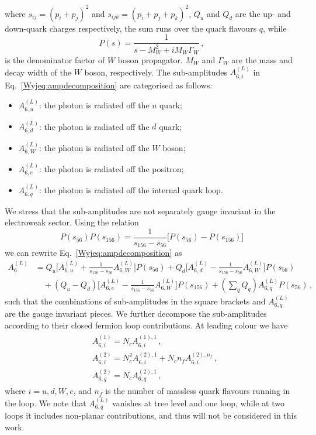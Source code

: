 \documentclass[main.tex]{subfiles}
\begin{document}
where $s_{ij}=(p_i+p_j)^2$ and $s_{ijk}=(p_i+p_j+p_k)^2$, $Q_u$ and $Q_d$ are the up- and down-quark charges respectively, the sum runs over the quark flavours $q$, while 
\begin{equation}
P(s) = \frac{1}{s-M_W^2+i M_W \Gamma_W} \,,
\end{equation}
is the denominator factor of $W$ boson propagator. 
$M_W$ and $\Gamma_W$ are the mass and decay width of the $W$ boson, respectively.
The sub-amplitudes $A_{6,i}^{(L)}$ in Eq.~\eqref{Wyjeq:ampdecomposition} are categorised as follows:
\begin{itemize}
\item $A^{(L)}_{6,u}$: the photon is radiated off the $u$ quark;
\item $A^{(L)}_{6,d}$: the photon is radiated off the $d$ quark;
\item $A^{(L)}_{6,W}$: the photon is radiated off the $W$ boson;
\item $A^{(L)}_{6,e}$: the photon is radiated off the positron;
\item $A^{(L)}_{6,q}$: the photon is radiated off the internal quark loop.
\end{itemize}
%
We stress that the sub-amplitudes are not separately gauge invariant in the electroweak sector.
Using the relation~\cite{Campbell:2021mlr}
\begin{equation}
P(s_{56})P(s_{156}) = \frac{1}{s_{156}-s_{56}} \bigg[ P(s_{56}) - P(s_{156}) \bigg] 
\end{equation}
we can rewrite Eq.~\eqref{Wyjeq:ampdecomposition} as
\begin{align}
A_{6}^{(L)} & =   Q_u \bigg[ A^{(L)}_{6,u} + \frac{1}{s_{156}-s_{56}} A^{(L)}_{6,W} \bigg] P(s_{56})
                + Q_d \bigg[ A^{(L)}_{6,d} - \frac{1}{s_{156}-s_{56}} A^{(L)}_{6,W} \bigg] P(s_{56}) \nonumber \\
&         \quad + (Q_u - Q_d) \bigg[ A^{(L)}_{6,e} - \frac{1}{s_{156}-s_{56}} A^{(L)}_{6,W} \bigg] P(s_{156})
          + \left(\sum_q Q_q\right) A^{(L)}_{6,q} P(s_{56}) \,, 
\label{Wyjeq:gaugeinvariantamps}
\end{align}
such that the combinations of sub-amplitudes in the square brackets and $A^{(L)}_{6,q}$ are the gauge invariant pieces.
We further decompose the sub-amplitudes according to their closed fermion loop contributions. At leading colour we have
\begin{align} \label{Wyjeq:NFdecomposition}
\begin{aligned}
& A^{(1)}_{6,i} = N_c A^{(1),1}_{6,i} \,, \\
& A^{(2)}_{6,i} = N_c^2 A^{(2),1}_{6,i} + N_c n_f A^{(2),n_f}_{6,i} \,, \\
& A^{(2)}_{6,q} = N_c A^{(2),1}_{6,q}  \,,
\end{aligned}
\end{align}
where  $i=u,d,W,e$, and $n_f$ is the number of massless quark flavours running in the loop. 
We note that $A^{(L)}_{6,q}$ vanishes at tree level and one loop, while at two loops it includes non-planar contributions, and thus will not be considered in this work.
\end{document}
